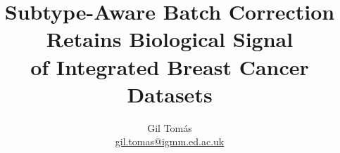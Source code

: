\documentclass{article}
\begin{document}
\title{Subtype-Aware Batch Correction Retains Biological Signal\\
  of Integrated Breast Cancer Datasets}

\author{Gil Tom\'as\\
  \href{mailto:gil.tomas@igmm.ed.ac.uk}{gil.tomas@igmm.ed.ac.uk}
}

\maketitle

\tableofcontents
\end{document}
